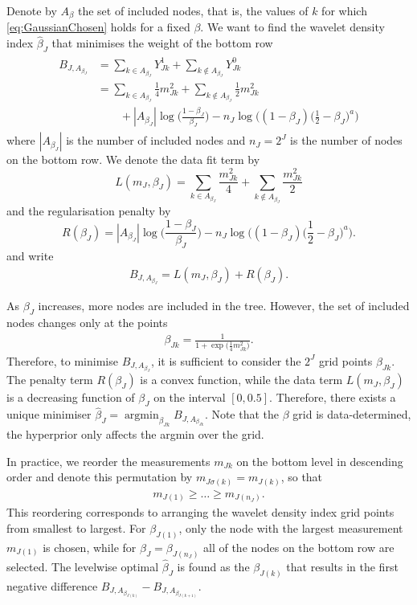 \documentclass[11pt,a4paper]{article}
\DeclareMathOperator*{\argmin}{argmin}
\begin{document}
Denote by $A_\beta$ the set of included nodes, that is, the values of $k$ for which \eqref{eq:GaussianChosen} holds for a fixed $\beta$. We want to find the wavelet density index $\hat{\beta}_J$ that minimises the weight of the bottom row 
\begin{align}
\begin{split}
B_{J,A_{\beta_J}}
& = \sum_{k\in A_{\beta_J}} Y^1_{Jk}
+\sum_{k\notin A_{\beta_J}} Y^0_{Jk}\\
& = \sum_{k\in A_{\beta_J}}\frac{1}{4}m^2_{Jk} 
+ \sum_{k\notin A_{\beta_J}}\frac{1}{2}m^2_{Jk}\\
& \quad\quad +|A_{\beta_J}|\log\Big(\frac{1-\beta_J}{\beta_J}\Big)
-n_J\log\bigg((1-\beta_J)\Big(\frac{1}{2}-\beta_J\Big)^a\bigg)
\end{split}
\end{align}
where $|A_{\beta_J}|$ is the number of included nodes and $n_J=2^J$ is the number of nodes on the bottom row. We denote the data fit term by
$$L(m_J,\beta_J)=\sum_{k\in A_{\beta_J}}\frac{m^2_{Jk}}{4}+\sum_{k\notin A_{\beta_J}}\frac{m^2_{Jk}}{2}$$
and the regularisation penalty by
$$R(\beta_J)=|A_{\beta_J}|\log\Big(\frac{1-\beta_J}{\beta_J}\Big)
-n_J\log\bigg((1-\beta_J)\Big(\frac{1}{2}-\beta_J\Big)^a\bigg).$$
and write 
\begin{align}\label{eq:WeightBottomGaussian}
B_{J,A_{\beta_J}} = L(m_J,\beta_J)+R(\beta_J).
\end{align}

As $\beta_J$ increases, more nodes are included in the tree. However, the set of included nodes changes only at the points 
\begin{align*}
\beta_{Jk} = \frac{1}{1+\exp\big(\frac{1}{4}m^2_{Jk}\big)}.
\end{align*}
Therefore, to minimise $B_{J,A_{\beta_J}}$, it is sufficient to consider the $2^J$ grid points $\beta_{Jk}$. 
The penalty term $R(\beta_J)$ is a convex function, while the data term $L(m_J,\beta_J)$ is a decreasing function of $\beta_J$ on the interval $[0,0.5]$. Therefore, there exists a unique minimiser $\hat{\beta}_J=\argmin_{\beta_{Jk}} B_{J,A_{\beta_{Jk}}}$. 
Note that the $\beta$ grid is data-determined, the hyperprior only affects the argmin over the grid.

In practice, we reorder the measurements $m_{Jk}$ on the bottom level in descending order and denote this permutation by $m_{J\sigma(k)}=m_{J(k)}$, so that
\begin{align*}
m_{J(1)}\geq \dots \geq m_{J(n_J)}. 
\end{align*}
This reordering corresponds to arranging the wavelet density index grid points from smallest to largest. For $\beta_{J(1)}$, only the node with the largest measurement $m_{J(1)}$ is chosen, while for $\beta_J=\beta_{J(n_J)}$ all of the nodes on the bottom row are selected. The levelwise optimal $\hat{\beta}_J$ is found as the $\beta_{J(k)}$ that results in the first negative difference $B_{J,A_{\beta_{J(k)}}}-B_{J,A_{\beta_{J(k+1)}}}$. 
\end{document}

